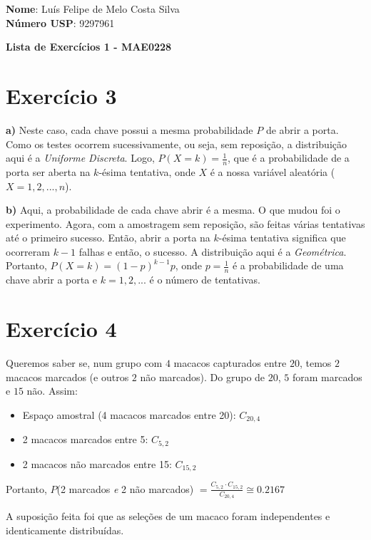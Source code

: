 \documentclass[12pt,letterpaper]{article}
\begin{document}
	
	\textbf{Nome}: Luís Felipe de Melo Costa Silva \\
	\textbf{Número USP}: 9297961 
    
	\begin{center}
		\LARGE \bf
		Lista de Exercícios 1 - MAE0228
	\end{center}
	
	\section*{Exercício 3}
	
	\textbf{a)} Neste caso, cada chave possui a mesma probabilidade $P$ de abrir a porta. Como os testes ocorrem sucessivamente, ou seja, sem reposição, a distribuição aqui é a \textit{Uniforme Discreta}. Logo, $P(X=k) = \frac{1}{n}$, que é a probabilidade de a porta ser aberta na $k$-ésima tentativa, onde $X$ é a nossa variável aleatória ($X = 1, 2, ..., n$). 
	
	\textbf{b)} Aqui, a probabilidade de cada chave abrir é a mesma. O que mudou foi o experimento. Agora, com a amostragem sem reposição, são feitas várias tentativas até o primeiro sucesso. Então, abrir a porta na $k$-ésima tentativa significa que ocorreram $k-1$ falhas e então, o sucesso. A distribuição aqui é a \textit{Geométrica}. Portanto, $P(X=k) = (1-p)^{k-1}p$, onde $p = \frac{1}{n}$ é a probabilidade de uma chave abrir a porta e $k = 1, 2, ...$ é o número de tentativas.
	
	\section*{Exercício 4}
	
	Queremos saber se, num grupo com $4$ macacos capturados entre $20$, temos $2$ macacos marcados (e outros $2$ não marcados). Do grupo de $20$, $5$ foram marcados e $15$ não. Assim:
	
	\begin{itemize}
		\item Espaço amostral (4 macacos marcados entre 20): $C_{20,4}$
		\item 2 macacos marcados entre 5: $C_{5,2}$
		\item 2 macacos não marcados entre 15: $C_{15,2}$
	\end{itemize}
	
	Portanto, $P$(2 marcados \textit{e} 2 não marcados) $= \frac{C_{5,2} \cdot C_{15,2}}{C_{20,4}} \cong 0.2167$
	
	A suposição feita foi que as seleções de um macaco foram independentes e identicamente distribuídas. 
	
\end{document}
